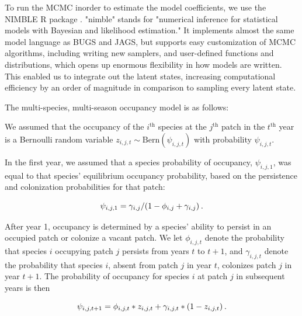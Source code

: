 \documentclass{article}\usepackage[]{graphicx}\usepackage[]{color}
\begin{document}
To run the MCMC inorder to estimate the model coefficients, we use the
NIMBLE R package \citep{nimble-14, de2017programming}.  "nimble"
stands for "numerical inference for statistical models with Bayesian
and likelihood estimation."  It implements almost the same model
language as BUGS and JAGS, but supports easy customization of MCMC
algorithms, including writing new samplers, and user-defined functions
and distributions, which opens up enormous flexibility in how models
are written. This enabled us to integrate out the latent states,
increasing computational efficiency by an order of magnitude in
comparison to sampling every latent state. 


The multi-species, multi-season occupancy model is as follows: 

 We
assumed that the occupancy of the $i^{\mathrm{th}}$ species at the
$j^{\mathrm{th}}$ patch in the $t^{\mathrm{th}}$ year is a Bernoulli random variable $z_{i,j,t} \sim \mathrm{Bern}(\psi_{i,j,t})$ with
probability $\psi_{i,j,t}$.

In the first year, we assumed that a species probability of occupancy,
$\psi_{i,j,1}$, was equal to that species' equilibrium occupancy
probability, based on the persistence and colonization probabilities
for that patch:

%
\begin{equation}
  \label{eq:occupancy2}
  \psi_{i,j,1} = \gamma_{i,j}/(1-\phi_{i,j} + \gamma_{i,j}) \hspace{0.2em}.
\end{equation}
%


After year 1, occupancy is determined by a
species' ability to persist in an occupied patch or colonize a vacant patch.  We let $\phi_{i,j,t}$ denote the probability that
species $i$ occupying patch $j$ persists from years $t$ to $t+1$, and
$\gamma_{i,j,t}$ denote the probability that species $i$, absent from
patch $j$ in year $t$, colonizes patch $j$ in year $t+1$.  The probability of occupancy for species $i$ at patch $j$ in
subsequent years is then

%
\begin{equation}
  \label{eq:occupancy1}
  \psi_{i,j,t+1} =
  \phi_{i,j,t} * z_{i,j,t} + \gamma_{i,j,t} * (1-z_{i,j,t})\hspace{0.2em}.
\end{equation}
%
\end{document}
